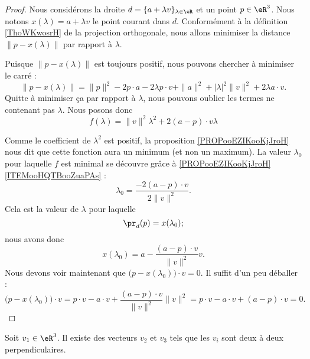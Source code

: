 \begin{proof}
	Nous considérons la droite \( d=\{ a+\lambda v \}_{\lambda\in \eR}\) et un point \( p\in \eR^3\). Nous notons \( x(\lambda)=a+\lambda v\) le point courant dans \( d\). Conformément à la définition \ref{ThoWKwosrH} de la projection orthogonale, nous allons minimiser la distance \( \| p-x(\lambda) \|\) par rapport à \( \lambda\).

	Puisque \( \| p-x(\lambda) \|\) est toujours positif, nous pouvons chercher à minimiser le carré :
	\begin{equation}
		\| p- x(\lambda) \|=\| p \|^2-2p\cdot a-2\lambda p\cdot v+\| a \|^2+| \lambda |^2\| v \|^2+2\lambda a\cdot v.
	\end{equation}
	Quitte à minimiser ça par rapport à \( \lambda\), nous pouvons oublier les termes ne contenant pas \( \lambda\). Nous posons donc
	\begin{equation}
		f(\lambda)=\| v \|^2\lambda^2+ 2(a-p)\cdot v\lambda
	\end{equation}

	Comme le coefficient de \( \lambda^2\) est positif, la proposition \ref{PROPooEZIKooKjJroH} nous dit que cette fonction aura un minimum (et non un maximum). La valeur \( \lambda_0\) pour laquelle \( f\) est minimal se découvre grâce à \ref{PROPooEZIKooKjJroH}\ref{ITEMooHQTBooZuaPAs} :
	\begin{equation}
		\lambda_0=\frac{ -2(a-p)\cdot v }{ 2\| v \|^2 }.
	\end{equation}
	Cela est la valeur de \( \lambda\) pour laquelle
	\begin{equation}
		\pr_d(p)=x(\lambda_0);
	\end{equation}
	nous avons donc
	\begin{equation}
		x(\lambda_0)=a-\frac{ (a-p)\cdot v }{ \| v \|^2 }v.
	\end{equation}
	Nous devons voir maintenant que \( \big( p-x(\lambda_0) \big)\cdot v=0\). Il suffit d'un peu déballer :
	\begin{equation}
		\big( p-x(\lambda_0) \big)\cdot v=p\cdot v-a\cdot v+\frac{ (a-p)\cdot v }{ \| v \|^2 }\| v \|^2=p\cdot v-a\cdot v+(a-p)\cdot v=0.
	\end{equation}
\end{proof}

\begin{lemma}       \label{LEMooGUVMooPXtXnV}
	Soit \( v_1\in \eR^3\). Il existe des vecteurs \( v_2\) et \( v_3\) tels que les \( v_i\) sont deux à deux perpendiculaires.
\end{lemma}


